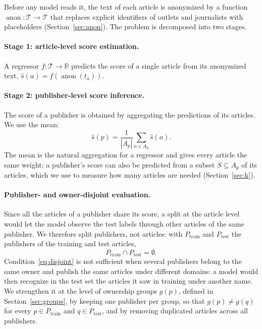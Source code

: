 \documentclass[11pt,a4paper]{article}
\newcommand{\anon}{\operatorname{anon}}
\begin{document}
Before any model reads it, the text of each article is anonymized by a function $\anon: \mathcal{T} \rightarrow
\mathcal{T}$ that replaces explicit identifiers of outlets and journalists with placeholders
(Section~\ref{sec:anon}). The problem is decomposed into two stages.

\paragraph{Stage 1: article-level score estimation.}
A regressor $f: \mathcal{T} \rightarrow \mathbb{R}$ predicts the score of a single article from its anonymized text,
$\hat{s}(a) = f(\anon(t_a))$.

\paragraph{Stage 2: publisher-level score inference.}
The score of a publisher is obtained by aggregating the predictions of its articles. We use the mean:
\[
\hat{s}(p) = \frac{1}{|A_p|} \sum_{a \in A_p} \hat{s}(a).
\]
The mean is the natural aggregation for a regressor and gives every article the same weight; a publisher's score
can also be predicted from a subset $S \subseteq A_p$ of its articles, which we use to measure how many articles are
needed (Section~\ref{sec:k}).

\paragraph{Publisher- and owner-disjoint evaluation.}
Since all the articles of a publisher share its score, a split at the article level would let the model observe the
test labels through other articles of the same publisher. We therefore split publishers, not articles: with
$P_{\text{train}}$ and $P_{\text{test}}$ the publishers of the training and test articles,
\begin{equation}\label{eq:disjoint}
P_{\text{train}} \cap P_{\text{test}} = \emptyset .
\end{equation}
Condition~\eqref{eq:disjoint} is not sufficient when several publishers belong to the same owner and publish the same
articles under different domains: a model would then recognize in the test set the articles it saw in training under
another name. We strengthen it at the level of ownership groups $g(p)$, defined in Section~\ref{sec:groups}, by keeping
one publisher per group, so that $g(p) \neq g(q)$ for every $p \in P_{\text{train}}$ and $q \in P_{\text{test}}$, and by
removing duplicated articles across all publishers.
\end{document}
